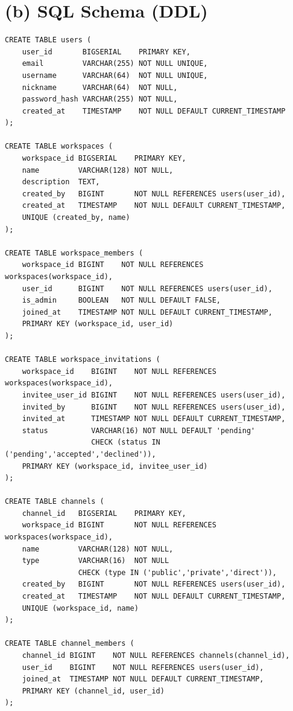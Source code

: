 \documentclass[11pt,letterpaper]{article}
\begin{document}
\section*{(b) SQL Schema (DDL)}

\begin{lstlisting}
CREATE TABLE users (
    user_id       BIGSERIAL    PRIMARY KEY,
    email         VARCHAR(255) NOT NULL UNIQUE,
    username      VARCHAR(64)  NOT NULL UNIQUE,
    nickname      VARCHAR(64)  NOT NULL,
    password_hash VARCHAR(255) NOT NULL,
    created_at    TIMESTAMP    NOT NULL DEFAULT CURRENT_TIMESTAMP
);

CREATE TABLE workspaces (
    workspace_id BIGSERIAL    PRIMARY KEY,
    name         VARCHAR(128) NOT NULL,
    description  TEXT,
    created_by   BIGINT       NOT NULL REFERENCES users(user_id),
    created_at   TIMESTAMP    NOT NULL DEFAULT CURRENT_TIMESTAMP,
    UNIQUE (created_by, name)
);

CREATE TABLE workspace_members (
    workspace_id BIGINT    NOT NULL REFERENCES workspaces(workspace_id),
    user_id      BIGINT    NOT NULL REFERENCES users(user_id),
    is_admin     BOOLEAN   NOT NULL DEFAULT FALSE,
    joined_at    TIMESTAMP NOT NULL DEFAULT CURRENT_TIMESTAMP,
    PRIMARY KEY (workspace_id, user_id)
);

CREATE TABLE workspace_invitations (
    workspace_id    BIGINT    NOT NULL REFERENCES workspaces(workspace_id),
    invitee_user_id BIGINT    NOT NULL REFERENCES users(user_id),
    invited_by      BIGINT    NOT NULL REFERENCES users(user_id),
    invited_at      TIMESTAMP NOT NULL DEFAULT CURRENT_TIMESTAMP,
    status          VARCHAR(16) NOT NULL DEFAULT 'pending'
                    CHECK (status IN ('pending','accepted','declined')),
    PRIMARY KEY (workspace_id, invitee_user_id)
);

CREATE TABLE channels (
    channel_id   BIGSERIAL    PRIMARY KEY,
    workspace_id BIGINT       NOT NULL REFERENCES workspaces(workspace_id),
    name         VARCHAR(128) NOT NULL,
    type         VARCHAR(16)  NOT NULL
                 CHECK (type IN ('public','private','direct')),
    created_by   BIGINT       NOT NULL REFERENCES users(user_id),
    created_at   TIMESTAMP    NOT NULL DEFAULT CURRENT_TIMESTAMP,
    UNIQUE (workspace_id, name)
);

CREATE TABLE channel_members (
    channel_id BIGINT    NOT NULL REFERENCES channels(channel_id),
    user_id    BIGINT    NOT NULL REFERENCES users(user_id),
    joined_at  TIMESTAMP NOT NULL DEFAULT CURRENT_TIMESTAMP,
    PRIMARY KEY (channel_id, user_id)
);


\end{lstlisting}
\end{document}
